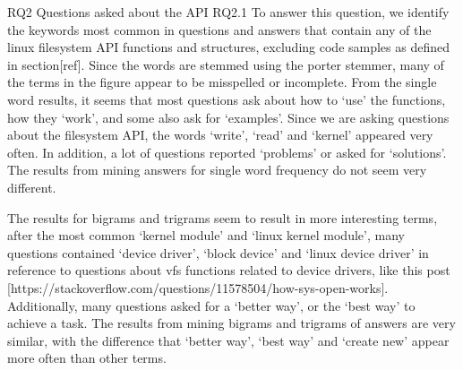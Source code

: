 RQ2
Questions asked about the API
RQ2.1
To answer this question, we identify the keywords most common in questions and answers that contain any of the linux filesystem API functions and structures, excluding code samples as defined in section[ref]. Since the words are stemmed using the porter stemmer, many of the terms in the figure appear to be misspelled or incomplete.
From the single word results, it seems that most questions ask about how to `use' the functions, how they `work', and some also ask for `examples'. Since we are asking questions about the filesystem API, the words `write', `read' and `kernel' appeared very often. In addition, a lot of questions reported `problems' or asked for `solutions'. The results from mining answers for single word frequency do not seem very different.

The results for bigrams and trigrams seem to result in more interesting terms, after the most common `kernel module' and `linux kernel module', many questions contained `device driver', `block device' and `linux device driver' in reference to questions about vfs functions related to device drivers, like this post [https://stackoverflow.com/questions/11578504/how-sys-open-works]. Additionally, many questions asked for a `better way', or the `best way' to achieve a task.
The results from mining bigrams and trigrams of answers are very similar, with the difference that `better way', `best way' and `create new' appear more often than other terms.

